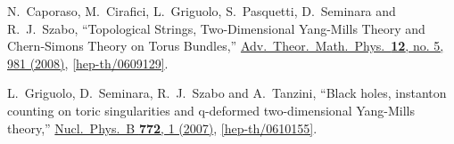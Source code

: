 \documentclass[11pt]{article}
\renewcommand{\[}{\begin{eqnarray}}
\renewcommand{\]}{\end{eqnarray}}
\begin{document}
\begin{thebibliography}{99}
  N.~Caporaso, M.~Cirafici, L.~Griguolo, S.~Pasquetti, D.~Seminara and R.~J.~Szabo,
  ``Topological Strings, Two-Dimensional Yang-Mills Theory and Chern-Simons Theory on Torus Bundles,''
 \href{http://dx.doi.org/10.4310/ATMP.2008.v12.n5.a2}{Adv.\ Theor.\ Math.\ Phys.\  {\bf 12}, no. 5, 981 (2008)},
  \href{http://arxiv.org/abs/hep-th/0609129}{[hep-th/0609129]}.

  L.~Griguolo, D.~Seminara, R.~J.~Szabo and A.~Tanzini,
  ``Black holes, instanton counting on toric singularities and q-deformed two-dimensional Yang-Mills theory,'' 
  \href{http://dx.doi.org/10.1016/j.nuclphysb.2007.02.030}{Nucl.\ Phys.\ B {\bf 772}, 1 (2007)},
 \href{http://arxiv.org/abs/hep-th/0610155}{[hep-th/0610155]}.



 \end{thebibliography}
\end{document}
